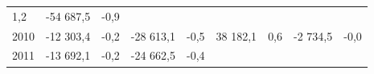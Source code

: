 \begin{longtable}[]{@{}lllllllll@{}}
\begin{minipage}[t]{0.06\columnwidth}
1,2\strut
\end{minipage} & \begin{minipage}[t]{0.08\columnwidth}\raggedright
-54 687,5\strut
\end{minipage} & \begin{minipage}[t]{0.06\columnwidth}\raggedright
-0,9\strut
\end{minipage}\tabularnewline
\begin{minipage}[t]{0.05\columnwidth}\raggedright
2010\strut
\end{minipage} & \begin{minipage}[t]{0.10\columnwidth}\raggedright
-12 303,4\strut
\end{minipage} & \begin{minipage}[t]{0.06\columnwidth}\raggedright
-0,2\strut
\end{minipage} & \begin{minipage}[t]{0.17\columnwidth}\raggedright
-28 613,1\strut
\end{minipage} & \begin{minipage}[t]{0.06\columnwidth}\raggedright
-0,5\strut
\end{minipage} & \begin{minipage}[t]{0.12\columnwidth}\raggedright
38 182,1\strut
\end{minipage} & \begin{minipage}[t]{0.06\columnwidth}\raggedright
0,6\strut
\end{minipage} & \begin{minipage}[t]{0.08\columnwidth}\raggedright
-2 734,5\strut
\end{minipage} & \begin{minipage}[t]{0.06\columnwidth}\raggedright
-0,0\strut
\end{minipage}\tabularnewline
\begin{minipage}[t]{0.05\columnwidth}\raggedright
2011\strut
\end{minipage} & \begin{minipage}[t]{0.10\columnwidth}\raggedright
-13 692,1\strut
\end{minipage} & \begin{minipage}[t]{0.06\columnwidth}\raggedright
-0,2\strut
\end{minipage} & \begin{minipage}[t]{0.17\columnwidth}\raggedright
-24 662,5\strut
\end{minipage} & \begin{minipage}[t]{0.06\columnwidth}\raggedright
-0,4\strut
\end{minipage} & \begin{minipage}[t]{0.12\columnwidth}\raggedright

\end{minipage}
\end{longtable}
